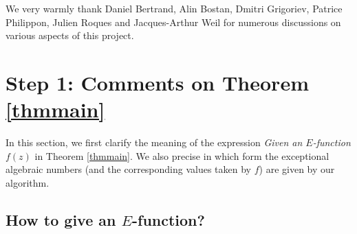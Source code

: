 \documentclass[reqno,english,12pt,a4paper]{smfart}
\numberwithin{equation}{section}
\begin{document}
 We very warmly thank Daniel Bertrand, Alin Bostan, Dmitri Grigoriev, Patrice Philippon, Julien Roques and Jacques-Arthur Weil  
for numerous discussions on various aspects of this project.


\section{Step 1: Comments on Theorem \ref{thmmain}}\label{sec:s1}

In this section, we first clarify  the meaning  of the expression 
\emph{Given an $E$-function $f(z)$} in Theorem \ref{thmmain}.  We also  
precise in which form the exceptional algebraic numbers (and the corresponding values taken by $f$) 
are given by our algorithm. 



\subsection{How to give an $E$-function?} 
\end{document}

